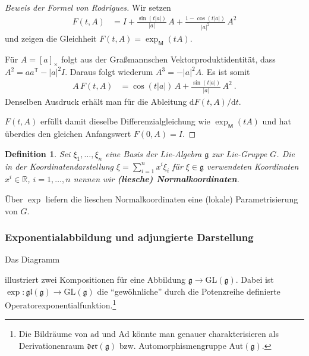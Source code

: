 \documentclass[10pt,a4paper]{article}
\theoremstyle{mytheorem}
\theoremstyle{mydefinition}
\newtheorem{definition}[theorem]{Definition}
\newcommand{\mydef}[1]{\textbf{\textit{#1}}}
\newcommand{\trans}{^\mathsf{T}}
\newcommand{\dt}{\mathrm{d}}
\newcommand{\ad}{\mathrm{ad}}
\newcommand{\Ad}{\mathrm{Ad}}
\newcommand{\fg}{\mathfrak{g}}
\begin{document}
\begin{proof}[Beweis der Formel von Rodrigues]
Wir setzen
\begin{align*}
	F(t,A) &=
	I 
	+ \frac{\sin(t|a|)}{|a|}\,A
	+ \frac{1 - \cos(t|a|)}{|a|^2}\,A^2
\end{align*} 
und zeigen die Gleichheit $F(t,A)=\exp_\mathsf{M}(tA)$.

Für $A=[a]_\times$ folgt aus der Graßmannschen Vektorproduktidentität, dass $A^2=aa\trans - |a|^2I$.
Daraus folgt wiederum $A^3=-|a|^2A$.
Es ist somit
\begin{align*}
	A\,F(t,A)
	&=
	\cos(t|a|)\,A
	+
	\frac{\sin(t|a|)}{|a|}\,A^2
	\ .	
\end{align*}
Denselben Ausdruck erhält man für die Ableitung $\dt F(t,A)/\dt t$.

$F(t,A)$ erfüllt damit dieselbe Differenzialgleichung wie $\exp_\mathsf{M}(tA)$ und hat überdies den gleichen Anfangswert $F(0,A)=I$.
\end{proof}

\begin{definition}
\label{def:normalcoords}
Sei $\xi_1,\ldots,\xi_n$ eine Basis der Lie-Algebra $\mathfrak{g}$ zur Lie-Gruppe $G$.
Die in der Koordinatendarstellung $\xi=\sum_{i=1}^n x^i\xi_i$ für $\xi\in\mathfrak{g}$ verwendeten Koordinaten $x^i\in\mathbb{R}$, $i=1,\ldots,n$ nennen wir \mydef{(liesche) Normalkoordinaten}.
\end{definition}
Über $\exp$ liefern die lieschen Normalkoordinaten eine (lokale) Parametrisierung von $G$.


\subsubsection{Exponentialabbildung und adjungierte Darstellung}

Das Diagramm
\begin{center}
\end{center}
illustriert zwei Kompositionen für eine Abbildung $\mathfrak{g}\rightarrow\mathrm{GL}(\fg)$.
Dabei ist $\exp:\mathfrak{gl}(\mathfrak{g})\rightarrow\mathrm{GL}(\mathfrak{g})$ die ``gewöhnliche'' durch die Potenzreihe definierte Operatorexponentialfunktion.\footnote{
	Die Bildräume von $\ad$ und $\Ad$ könnte man genauer charakterisieren als 	Derivationenraum $\mathfrak{der}(\fg)$ bzw. Automorphismengruppe $\mathrm{Aut}(\fg)$.
}
\end{document}
